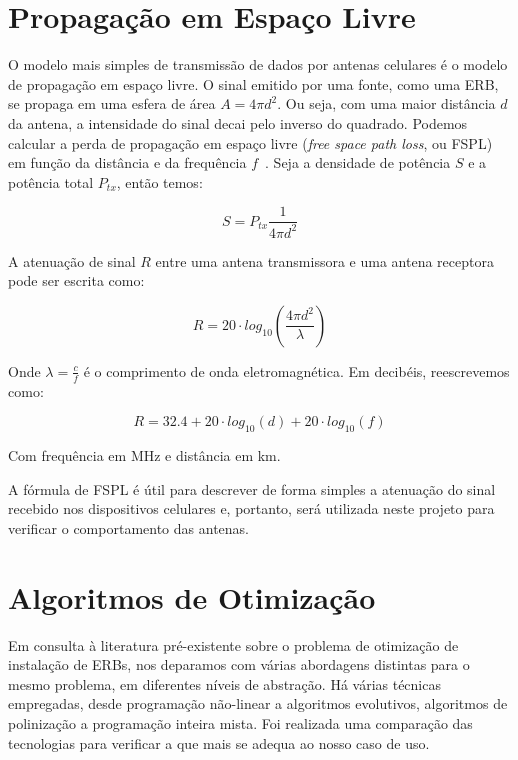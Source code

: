 \documentclass[]{politex}
\begin{document}
\section{Propagação em Espaço Livre}

O modelo mais simples de transmissão de dados por antenas celulares é o modelo
de propagação em espaço livre. O sinal emitido por uma fonte, como uma ERB, se
propaga em uma esfera de área $A = 4\pi d^2$. Ou seja, com uma maior distância
$d$ da antena, a intensidade do sinal decai pelo inverso do quadrado. Podemos
calcular a perda de propagação em espaço livre (\textit{free space path loss},
ou FSPL) em função da distância e da frequência $f$~\cite{rf-design}. Seja a
densidade de potência $S$ e a potência total $P_{tx}$, então temos:

\begin{equation*}
    S = P_{tx} \frac{1}{4\pi d^2}
\end{equation*}

A atenuação de sinal $R$ entre uma antena transmissora e uma antena receptora
pode ser escrita como:

\begin{equation*}
    R = 20\cdot log_{10} \left( \frac{4\pi d^2}{\lambda} \right)
\end{equation*}

Onde $\lambda = \frac{c}{f}$ é o comprimento de onda eletromagnética. Em
decibéis, reescrevemos como:

\begin{equation*}
    R = 32.4 + 20\cdot log_{10}(d) + 20\cdot log_{10}(f)
\end{equation*}

Com frequência em MHz e distância em km.

A fórmula de FSPL é útil para descrever de forma simples a atenuação do sinal
recebido nos dispositivos celulares e, portanto, será utilizada neste projeto
para verificar o comportamento das antenas.

\section{Algoritmos de Otimização}

Em consulta à literatura pré-existente sobre o problema de otimização de
instalação de ERBs, nos deparamos com várias abordagens distintas para o mesmo
problema, em diferentes níveis de abstração. Há várias técnicas empregadas,
desde programação não-linear a algoritmos evolutivos, algoritmos de polinização
a programação inteira mista. Foi realizada uma comparação das tecnologias para
verificar a que mais se adequa ao nosso caso de uso.
\end{document}

